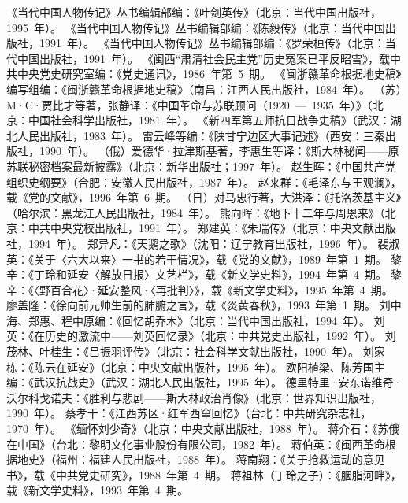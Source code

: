 \begin{thebibliography}{999}
\bibitem{}《当代中国人物传记》丛书编辑部编：《叶剑英传》（北京：当代中国出版社，1995~年）。
\bibitem{}《当代中国人物传记》丛书编辑部编：《陈毅传》（北京：当代中国出版社，1991~年）。
\bibitem{}《当代中国人物传记》丛书编辑部编：《罗荣桓传》（北京：当代中国出版社，1991~年）。
\bibitem{}《闽西“肃清社会民主党”历史冤案已平反昭雪》，载中共中央党史研究室编：《党史通讯》，1986~年第~5~期。
\bibitem{}《闽浙赣革命根据地史稿》编写组编：《闽浙赣革命根据地史稿》（南昌：江西人民出版社，1984~年）。
\bibitem{}（苏）M·C·贾比才等著，张静译：《中国革命与苏联顾问（1920~—~1935~年）》（北京：中国社会科学出版社，1981~年）。
\bibitem{}《新四军第五师抗日战争史稿》（武汉：湖北人民出版社，1983~年）。
\bibitem{}雷云峰等编：《陕甘宁边区大事记述》（西安：三秦出版社，1990~年）。
\bibitem{}（俄）爱德华·拉津斯基著，李惠生等译：《斯大林秘闻——原苏联秘密档案最新披露》（北京：新华出版社；1997~年）。
\bibitem{}赵生晖：《中国共产党组织史纲要》（合肥：安徽人民出版社，1987~年）。
\bibitem{}赵来群：《毛泽东与王观澜》，载《党的文献》，1996~年第~6~期。
\bibitem{}（日）对马忠行著，大洪泽：《托洛茨基主义》（哈尔滨：黑龙江人民出版社，1984~年）。
\bibitem{}熊向晖：《地下十二年与周恩来》（北京：中共中央党校出版社，1991~年）。
\bibitem{}郑建英：《朱瑞传》（北京：中央文献出版社，1994~年）。
\bibitem{}郑异凡：《天鹅之歌》（沈阳：辽宁教育出版社，1996~年）。
\bibitem{}裴淑英：《关于〈六大以来〉一书的若干情况》，载《党的文献》，1989~年第~1~期。
\bibitem{}黎辛：《丁玲和延安〈解放日报〉文艺栏》，载《新文学史料》，1994~年第~4~期。
\bibitem{}黎辛：《〈野百合花〉·延安整风·〈再批判〉》，载《新文学史料》，1995~年第~4~期。
\bibitem{}廖盖隆：《徐向前元帅生前的肺腑之言》，载《炎黄春秋》，1993~年第~1~期。
\bibitem{}刘中海、郑惠、程中原编：《回忆胡乔木》（北京：当代中国出版社，1994~年）。
\bibitem{}刘英：《在历史的激流中——刘英回忆录》（北京：中共党史出版社，1992~年）。
\bibitem{}刘茂林、叶桂生：《吕振羽评传》（北京：社会科学文献出版社，1990~年）。
\bibitem{}刘家栋：《陈云在延安》（北京：中央文献出版社，1995~年）。
\bibitem{}欧阳植梁、陈芳国主编：《武汉抗战史》（武汉：湖北人民出版社，1995~年）。
\bibitem{}德里特里·安东诺维奇·沃尔科戈诺夫：《胜利与悲剧——斯大林政治肖像》（北京：世界知识出版社，1990~年）。
\bibitem{}蔡孝干：《江西苏区·红军西窜回忆》（台北：中共研究杂志社，1970~年）。
\bibitem{}《缅怀刘少奇》（北京：中央文献出版社，1988~年）。
\bibitem{}蒋介石：《苏俄在中国》（台北：黎明文化事业股份有限公司，1982~年）。
\bibitem{}蒋伯英：《闽西革命根据地史》（福州：福建人民出版社，1988~年）。
\bibitem{}蒋南翔：《关于抢救运动的意见书》，载《中共党史研究》，1988~年第~4~期。
\bibitem{}蒋祖林（丁玲之子）：《胭脂河畔》，载《新文学史料》，1993~年第~4~期。

\end{thebibliography}
